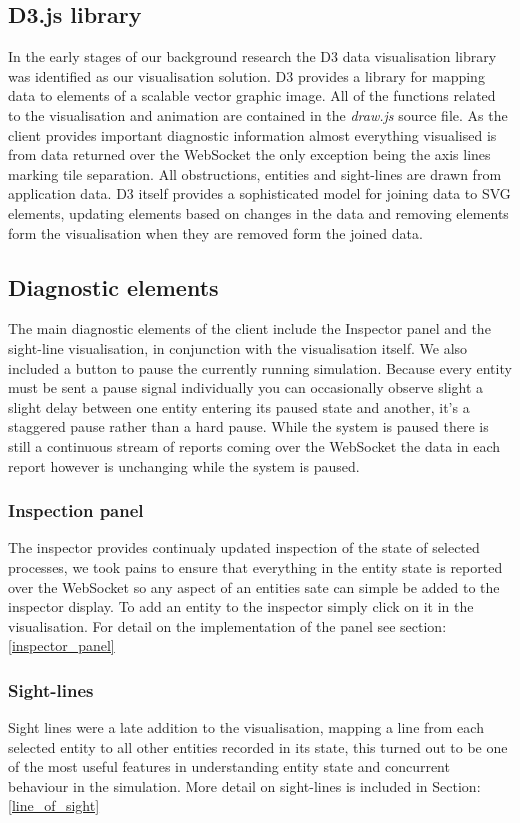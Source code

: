 \subsection{D3.js library}
In the early stages of our background research the D3 data visualisation library was identified as our visualisation solution. D3 provides a library for mapping data to elements of a scalable vector graphic image. All of the functions related to the visualisation and animation are contained in the \emph{draw.js} source file. As the client provides important diagnostic information almost everything visualised is from data returned over the WebSocket the only exception being the axis lines marking tile separation. All obstructions, entities and sight-lines are drawn from application data.
D3 itself provides a sophisticated model for joining data to SVG elements, updating elements based on changes in the data and removing elements form the visualisation when they are removed form the joined data.
\subsection{Diagnostic elements}
The main diagnostic elements of the client include the Inspector panel and the sight-line visualisation, in conjunction with the visualisation itself. We also included a button to pause the currently running simulation. Because every entity must be sent a pause signal individually you can occasionally observe slight a slight delay between one entity entering its paused state and another, it's a staggered pause rather than a hard pause. While the system is paused there is still a continuous stream of reports coming over the WebSocket the data in each report however is unchanging while the system is paused.
\subsubsection{Inspection panel}
The inspector provides continualy updated inspection of the state of selected processes, we took pains to ensure that everything in the entity state is reported over the WebSocket so any aspect of an entities sate can simple be added to the inspector display. To add an entity to the inspector simply click on it in the visualisation. For detail on the implementation of the panel see section:\ref{inspector_panel}
\subsubsection{Sight-lines}
\label{sight_lines}
Sight lines were a late addition to the visualisation, mapping a line from each selected entity to all other entities recorded in its state, this turned out to be one of the most useful features in understanding entity state and concurrent behaviour in the simulation. More detail on sight-lines is included in Section:\ref{line_of_sight} 

\clearpage
\endinput
